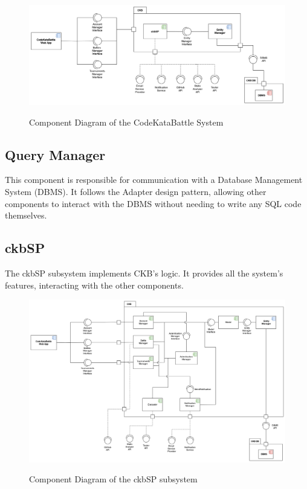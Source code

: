 \documentclass{Configuration_Files/Template}
\begin{document}
\begin{figure}[H]
\centering
\includegraphics[scale = 0.6]{Images/diagrams/Component_view.png}\\
\caption{Component Diagram of the CodeKataBattle System}
\end{figure}

\subsection{Query Manager}

This component is responsible for communication with a Database Management System (DBMS). It follows the Adapter design pattern, allowing other components to interact with the DBMS without needing to write any SQL code themselves.

\subsection{ckbSP}

The ckbSP subsystem implements CKB's logic. It provides all the system's features, interacting with the other components.

\begin{figure}[H]
\centering
\includegraphics[scale = 0.6]{Images/diagrams/ComponentViewCKBSP.png}\\
\caption{Component Diagram of the ckbSP subsystem}
\end{figure}
\end{document}
